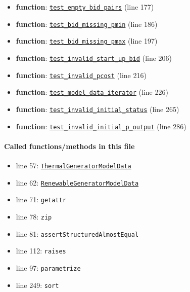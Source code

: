 \documentclass[11pt]{report}
\begin{document}
\begin{itemize}[leftmargin=*]
  \item \textbf{function}: \hyperref[def:tests-test_model_data.py:test_empty_bid_pairs:L177]{\texttt{test\_empty\_bid\_pairs}} (line 177)
  \item \textbf{function}: \hyperref[def:tests-test_model_data.py:test_bid_missing_pmin:L186]{\texttt{test\_bid\_missing\_pmin}} (line 186)
  \item \textbf{function}: \hyperref[def:tests-test_model_data.py:test_bid_missing_pmax:L197]{\texttt{test\_bid\_missing\_pmax}} (line 197)
  \item \textbf{function}: \hyperref[def:tests-test_model_data.py:test_invalid_start_up_bid:L206]{\texttt{test\_invalid\_start\_up\_bid}} (line 206)
  \item \textbf{function}: \hyperref[def:tests-test_model_data.py:test_invalid_pcost:L216]{\texttt{test\_invalid\_pcost}} (line 216)
  \item \textbf{function}: \hyperref[def:tests-test_model_data.py:test_model_data_iterator:L226]{\texttt{test\_model\_data\_iterator}} (line 226)
  \item \textbf{function}: \hyperref[def:tests-test_model_data.py:test_invalid_initial_status:L265]{\texttt{test\_invalid\_initial\_status}} (line 265)
  \item \textbf{function}: \hyperref[def:tests-test_model_data.py:test_invalid_initial_p_output:L286]{\texttt{test\_invalid\_initial\_p\_output}} (line 286)
\end{itemize}
\paragraph{Called functions/methods in this file}
\begin{itemize}[leftmargin=*]
  \item line 57: \hyperref[def:model_data.py:ThermalGeneratorModelData:L185]{\texttt{ThermalGeneratorModelData}}
  \item line 62: \hyperref[def:model_data.py:RenewableGeneratorModelData:L391]{\texttt{RenewableGeneratorModelData}}
  \item line 71: \texttt{getattr}
  \item line 78: \texttt{zip}
  \item line 81: \texttt{assertStructuredAlmostEqual}
  \item line 112: \texttt{raises}
  \item line 97: \texttt{parametrize}
  \item line 249: \texttt{sort}
\end{itemize}
\end{document}

